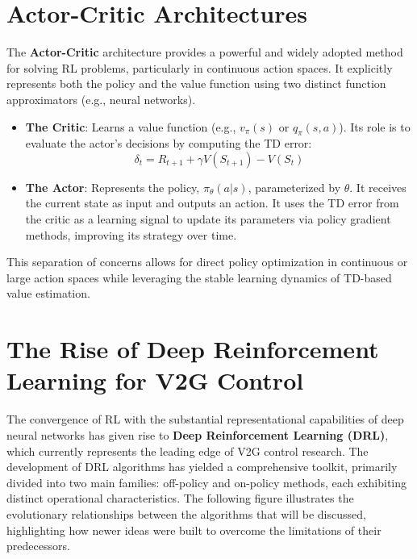 \section{Actor-Critic Architectures}
The \textbf{Actor-Critic} architecture provides a powerful and widely adopted method for solving RL problems, particularly in continuous action spaces. It explicitly represents both the policy and the value function using two distinct function approximators (e.g., neural networks).

\begin{itemize}
    \item \textbf{The Critic}: Learns a value function (e.g., $v_\pi(s)$ or $q_\pi(s, a)$). Its role is to evaluate the actor's decisions by computing the TD error:
    \begin{equation}
        \delta_t = R_{t+1} + \gamma V(S_{t+1}) - V(S_t)
    \end{equation}
    \item \textbf{The Actor}: Represents the policy, $\pi_\theta(a|s)$, parameterized by $\theta$. It receives the current state as input and outputs an action. It uses the TD error from the critic as a learning signal to update its parameters via policy gradient methods, improving its strategy over time.
\end{itemize}

This separation of concerns allows for direct policy optimization in continuous or large action spaces while leveraging the stable learning dynamics of TD-based value estimation.
 

\newpage
\section{The Rise of Deep Reinforcement Learning for V2G Control}

The convergence of RL with the substantial representational capabilities of deep neural networks has given rise to \textbf{Deep Reinforcement Learning (DRL)}, which currently represents the leading edge of V2G control research. The development of DRL algorithms has yielded a comprehensive toolkit, primarily divided into two main families: off-policy and on-policy methods, each exhibiting distinct operational characteristics.
The following figure illustrates the evolutionary relationships between the algorithms that  will be discussed, highlighting how newer ideas were built to overcome the limitations of their predecessors.


